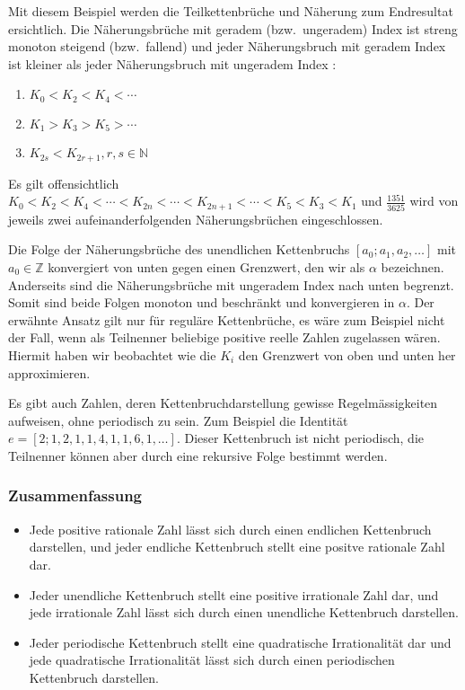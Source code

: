 Mit diesem Beispiel werden die Teilkettenbrüche und Näherung zum Endresultat
ersichtlich.
Die Näherungsbrüche mit geradem (bzw.~ungeradem) Index
ist streng monoton steigend (bzw.~fallend) und jeder Näherungsbruch
mit geradem Index ist kleiner als jeder Näherungsbruch mit ungeradem
Index \cite{kettenbruch:proseminar}:
\begin{enumerate}
\item
$K_0 < K_2 < K_4 < \cdots$
\item
$K_1 > K_3 > K_5 > \cdots$
\item
$K_{2s} < K_{2r+1}, r,s \in \mathbb{N}$
\end{enumerate}

Es gilt offensichtlich
$K_0 < K_2 < K_4 < \cdots < K_{2n} < \cdots < K_{2n+1} < \cdots < K_5
< K_3 < K_1$
und $\frac{1351}{3625}$ wird von jeweils zwei aufeinanderfolgenden
Näherungsbrüchen eingeschlossen.

Die Folge der Näherungsbrüche des unendlichen Kettenbruchs
$[a_0;a_1,a_2,\dots]$ mit $a_0 \in \mathbb{Z}$ konvergiert 
von unten gegen einen Grenzwert, den wir als $\alpha$
bezeichnen.
Anderseits sind die Näherungsbrüche mit ungeradem
Index nach unten begrenzt.
Somit sind beide Folgen monoton und beschränkt 
und konvergieren in $\alpha$.
Der erwähnte Ansatz gilt nur für reguläre Kettenbrüche, es 
wäre zum Beispiel nicht der Fall, wenn als Teilnenner beliebige positive
reelle Zahlen zugelassen wären. 
Hiermit haben wir beobachtet wie die $K_i$ den Grenzwert von oben und
unten her approximieren.

Es gibt auch Zahlen, deren Kettenbruchdarstellung gewisse
Regelmässigkeiten aufweisen, ohne periodisch zu sein. Zum Beispiel
die Identität $e = [2;1,2,1,1,4,1,1,6,1,\dots]$. Dieser
Kettenbruch ist nicht periodisch, die Teilnenner können aber durch
eine rekursive Folge bestimmt werden.

\subsubsection{Zusammenfassung}
\begin{itemize}
\item
Jede positive rationale Zahl lässt sich durch einen endlichen
Kettenbruch darstellen, und jeder endliche Kettenbruch stellt eine
positve rationale Zahl dar.
\item
Jeder unendliche Kettenbruch stellt eine positive irrationale Zahl
dar, und jede irrationale Zahl lässt sich durch einen unendliche
Kettenbruch darstellen.
\item
Jeder periodische Kettenbruch stellt eine quadratische Irrationalität
dar und jede quadratische Irrationalität lässt sich durch einen
periodischen Kettenbruch darstellen.
\end{itemize}
